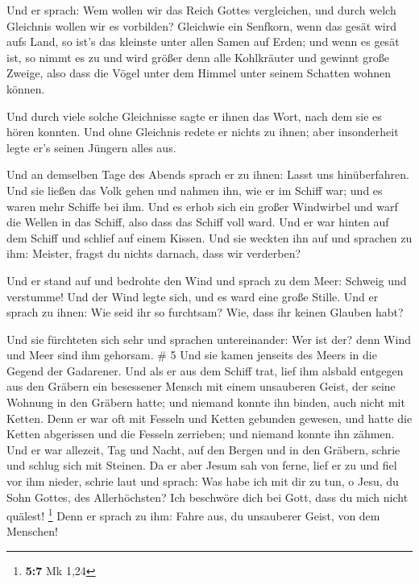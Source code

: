  Und er sprach: Wem wollen wir das Reich Gottes
vergleichen, und durch welch Gleichnis wollen wir es vorbilden?
 Gleichwie ein Senfkorn, wenn das gesät wird aufs Land, so
ist's das kleinste unter allen Samen auf Erden;  und wenn
es gesät ist, so nimmt es zu und wird größer denn alle Kohlkräuter und
gewinnt große Zweige, also dass die Vögel unter dem Himmel unter seinem
Schatten wohnen können.

 Und durch viele solche Gleichnisse sagte er ihnen das
Wort, nach dem sie es hören konnten.  Und ohne Gleichnis
redete er nichts zu ihnen; aber insonderheit legte er's seinen Jüngern
alles aus.

 Und an demselben Tage des Abends sprach er zu ihnen: Lasst
uns hinüberfahren.  Und sie ließen das Volk gehen und
nahmen ihn, wie er im Schiff war; und es waren mehr Schiffe bei ihm.
 Und es erhob sich ein großer Windwirbel und warf die
Wellen in das Schiff, also dass das Schiff voll ward.  Und
er war hinten auf dem Schiff und schlief auf einem Kissen. Und sie
weckten ihn auf und sprachen zu ihm: Meister, fragst du nichts darnach,
dass wir verderben?

 Und er stand auf und bedrohte den Wind und sprach zu dem
Meer: Schweig und verstumme! Und der Wind legte sich, und es ward eine
große Stille.  Und er sprach zu ihnen: Wie seid ihr so
furchtsam? Wie, dass ihr keinen Glauben habt?

 Und sie fürchteten sich sehr und sprachen untereinander:
Wer ist der? denn Wind und Meer sind ihm gehorsam. \# 5  Und
sie kamen jenseits des Meers in die Gegend der Gadarener. 
Und als er aus dem Schiff trat, lief ihm alsbald entgegen aus den
Gräbern ein besessener Mensch mit einem unsauberen Geist, 
der seine Wohnung in den Gräbern hatte; und niemand konnte ihn binden,
auch nicht mit Ketten.  Denn er war oft mit Fesseln und
Ketten gebunden gewesen, und hatte die Ketten abgerissen und die Fesseln
zerrieben; und niemand konnte ihn zähmen.  Und er war
allezeit, Tag und Nacht, auf den Bergen und in den Gräbern, schrie und
schlug sich mit Steinen.  Da er aber Jesum sah von ferne,
lief er zu und fiel vor ihm nieder, schrie laut und sprach: 
Was habe ich mit dir zu tun, o Jesu, du Sohn Gottes, des Allerhöchsten?
Ich beschwöre dich bei Gott, dass du mich nicht quälest! \footnote{\textbf{5:7}
  Mk 1,24}  Denn er sprach zu ihm: Fahre aus, du unsauberer
Geist, von dem Menschen!

